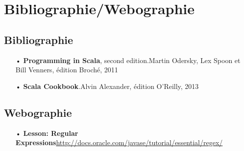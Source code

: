 \section*{Bibliographie/Webographie}

\subsection*{Bibliographie}

\begin{itemize}
\item[•] \textbf{Programming in Scala}, second edition.\newline Martin Odersky, Lex Spoon et Bill Venners, édition Broché, 2011
\vspace{0.4cm}
\item[•] \textbf{Scala Cookbook}.\newline Alvin Alexander, édition O'Reilly, 2013
\end{itemize}

\subsection*{Webographie}

\begin{itemize}
\item[•] \textbf{Lesson: Regular Expressions}\newline \url{http://docs.oracle.com/javase/tutorial/essential/regex/}
\end{itemize}

